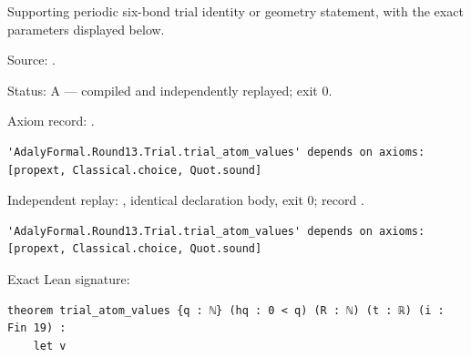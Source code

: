 \begin{theorem}[bp-417]
\label{bp-417}
\leanok
Supporting periodic six-bond trial identity or geometry statement, with the exact parameters displayed below.

\par Source: \texttt{}.
\par Status: A — compiled and independently replayed; exit 0.
\par Axiom record: \texttt{}.
\begin{verbatim}
'AdalyFormal.Round13.Trial.trial_atom_values' depends on axioms: [propext, Classical.choice, Quot.sound]
\end{verbatim}
\par Independent replay: \texttt{}, identical declaration body, exit 0; record \texttt{}.
\begin{verbatim}
'AdalyFormal.Round13.Trial.trial_atom_values' depends on axioms: [propext, Classical.choice, Quot.sound]
\end{verbatim}
\par Exact Lean signature:
\begin{verbatim}
theorem trial_atom_values {q : ℕ} (hq : 0 < q) (R : ℕ) (t : ℝ) (i : Fin 19) :
    let v
\end{verbatim}
\end{theorem}

